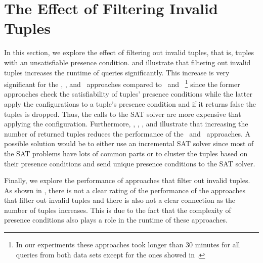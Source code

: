 \section{The Effect of Filtering Invalid Tuples}
\label{sec:exp-tuples}

In this section, we explore the effect of filtering out invalid tuples, that is, tuples with
an unsatisfiable presence condition.  and 
illustrate that filtering out invalid tuples increases the runtime of queries significantly. 
%
This increase is very significant for the \ubf, \ubfi, and \uav\ approaches compared to
\nbf\ and \nbfi\ 
\footnote{In our experiments these approaches took longer than 30 minutes for 
all queries from both data sets except for the ones showed in .
}
since the former approaches check the satisfiability of tuples' 
presence conditions while the latter apply the configurations to a tuple's 
presence condition and if it returns false the tuples is dropped. Thus,
the calls to the SAT solver are more expensive that applying the configuration.
%
Furthermore, , , 
\figref{emp-nbfi-tuple}, and \figref{emp-nbf-tuple} illustrate that increasing the number of 
returned tuples reduces the performance of the \nbf\ and \nbfi\ approaches. 
%
A possible solution would be to either use an incremental SAT solver since most of the
SAT problems have lots of common parts or to cluster the tuples based on their presence
conditions and send unique presence conditions to the SAT solver. 

Finally, we explore the performance of approaches that filter out invalid tuples. 
As shown in \figref{filter-comp}, there is not a clear rating of
the performance of the approaches that filter out invalid tuples and there is also
not a clear connection as the number of tuples increases. This is due to the fact that 
the complexity of presence conditions also plays a role in the runtime of these approaches. 

